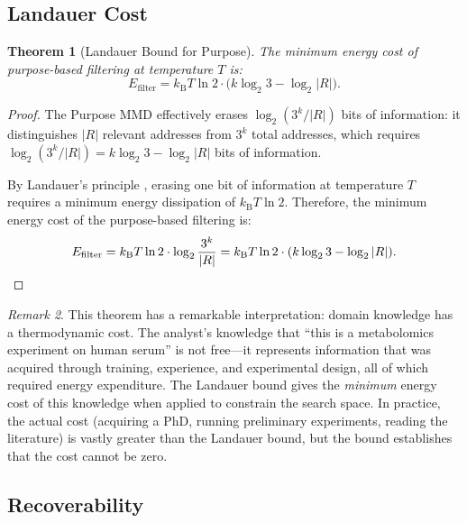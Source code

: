 \documentclass[11pt,twocolumn,a4paper]{article}
\newtheorem{theorem}{Theorem}[section]
\theoremstyle{definition}
\theoremstyle{remark}
\newtheorem{remark}[theorem]{Remark}
\newcommand{\kB}{k_{\mathrm{B}}}
\begin{document}
\subsection{Landauer Cost}\label{sec:landauer}

\begin{theorem}[Landauer Bound for Purpose]\label{thm:landauer}
The minimum energy cost of purpose-based filtering at temperature $T$ is:
\begin{equation}\label{eq:landauer}
  E_{\mathrm{filter}} = \kB T \ln 2 \cdot \bigl(k \log_2 3 - \log_2 |R|\bigr).
\end{equation}
\end{theorem}

\begin{proof}
The Purpose MMD effectively erases $\log_2(3^k / |R|)$ bits of information: it distinguishes $|R|$ relevant addresses from $3^k$ total addresses, which requires $\log_2(3^k / |R|) = k \log_2 3 - \log_2 |R|$ bits of information.

By Landauer's principle \citep{landauer1961}, erasing one bit of information at temperature $T$ requires a minimum energy dissipation of $\kB T \ln 2$. Therefore, the minimum energy cost of the purpose-based filtering is:
\begin{equation}
  E_{\mathrm{filter}} = \kB T \ln 2 \cdot \log_2 \frac{3^k}{|R|} = \kB T \ln 2 \cdot (k \log_2 3 - \log_2 |R|). \qedhere
\end{equation}
\end{proof}

\begin{remark}\label{rem:landauer-interpretation}
This theorem has a remarkable interpretation: domain knowledge has a thermodynamic cost. The analyst's knowledge that ``this is a metabolomics experiment on human serum'' is not free---it represents information that was acquired through training, experience, and experimental design, all of which required energy expenditure. The Landauer bound gives the \emph{minimum} energy cost of this knowledge when applied to constrain the search space. In practice, the actual cost (acquiring a PhD, running preliminary experiments, reading the literature) is vastly greater than the Landauer bound, but the bound establishes that the cost cannot be zero.
\end{remark}

\subsection{Recoverability}\label{sec:recoverability}
\end{document}
